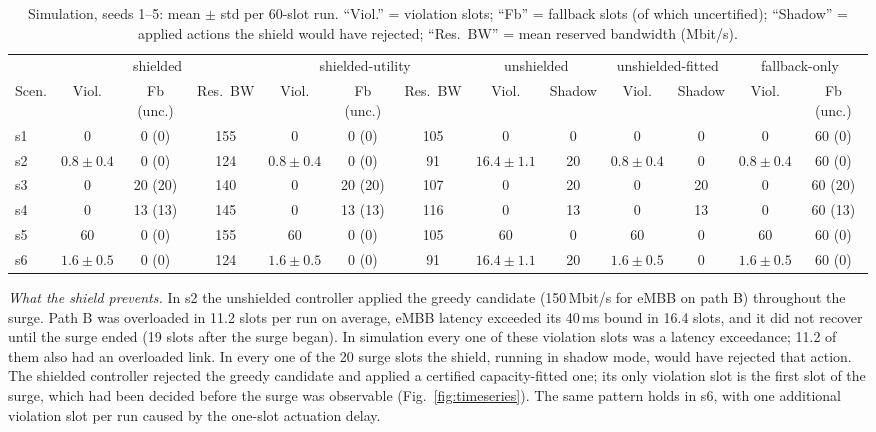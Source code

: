 \begin{table}[t]
\caption{Simulation, seeds 1--5: mean $\pm$ std per 60-slot run. ``Viol.'' = violation slots; ``Fb'' = fallback slots (of which uncertified); ``Shadow'' = applied actions the shield would have rejected; ``Res.\ BW'' = mean reserved bandwidth (Mbit/s).}
\label{tab:sim}
\centering
\footnotesize
\setlength{\tabcolsep}{3.5pt}
\begin{tabular}{@{}l|ccc|ccc|cc|cc|cc@{}}
\toprule
& \multicolumn{3}{c|}{shielded} & \multicolumn{3}{c|}{shielded-utility} & \multicolumn{2}{c|}{unshielded} & \multicolumn{2}{c|}{unshielded-fitted} & \multicolumn{2}{c}{fallback-only}\\
Scen. & Viol. & Fb (unc.) & Res.\ BW & Viol. & Fb (unc.) & Res.\ BW & Viol. & Shadow & Viol. & Shadow & Viol. & Fb (unc.)\\
\midrule
s1 & 0 & 0 (0) & 155 & 0 & 0 (0) & 105 & 0 & 0 & 0 & 0 & 0 & 60 (0)\\
s2 & $0.8\pm0.4$ & 0 (0) & 124 & $0.8\pm0.4$ & 0 (0) & 91 & $16.4\pm1.1$ & 20 & $0.8\pm0.4$ & 0 & $0.8\pm0.4$ & 60 (0)\\
s3 & 0 & 20 (20) & 140 & 0 & 20 (20) & 107 & 0 & 20 & 0 & 20 & 0 & 60 (20)\\
s4 & 0 & 13 (13) & 145 & 0 & 13 (13) & 116 & 0 & 13 & 0 & 13 & 0 & 60 (13)\\
s5 & 60 & 0 (0) & 155 & 60 & 0 (0) & 105 & 60 & 0 & 60 & 0 & 60 & 60 (0)\\
s6 & $1.6\pm0.5$ & 0 (0) & 124 & $1.6\pm0.5$ & 0 (0) & 91 & $16.4\pm1.1$ & 20 & $1.6\pm0.5$ & 0 & $1.6\pm0.5$ & 60 (0)\\
\bottomrule
\end{tabular}
\end{table}

\emph{What the shield prevents.} In s2 the unshielded controller applied the greedy
candidate (150\,Mbit/s for eMBB on path B) throughout the surge. Path B was
overloaded in 11.2 slots per run on average, eMBB latency exceeded its 40\,ms bound
in 16.4 slots, and it did not recover until the surge ended (19 slots after the
surge began). In simulation every one of these violation slots was a latency
exceedance; 11.2 of them also had an overloaded link. In every one of the 20
surge slots the shield, running in shadow mode, would have rejected that action.
The shielded controller rejected the greedy candidate and applied a certified
capacity-fitted one; its only violation slot is the first slot of the surge, which
had been decided before the surge was observable (Fig.~\ref{fig:timeseries}). The
same pattern holds in s6, with one additional violation slot per run caused by the
one-slot actuation delay.

